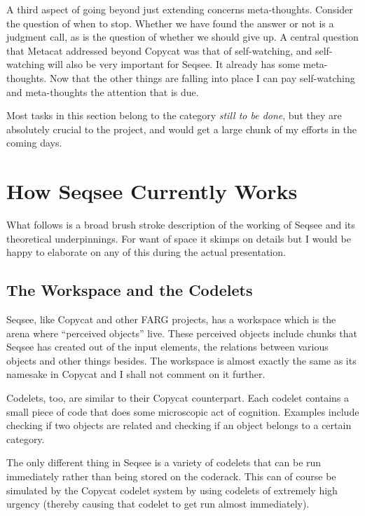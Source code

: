\documentclass[letterpaper]{article}
\begin{document}
A third aspect of going beyond just extending concerns meta-thoughts.  Consider the question of when to stop.  Whether we have found the answer or not is a judgment call, as is the question of whether we should give up. A central question that Metacat addressed beyond Copycat was that of self-watching, and self-watching will also be very important for Seqsee. It already has some meta-thoughts. Now that the other things are falling into place I can pay self-watching and meta-thoughts the attention that is due. 

Most tasks in this section belong to the category \emph{still to be done}, but they are absolutely crucial to the project, and would get a large chunk of my efforts in the coming days.



\section{How Seqsee Currently Works}
\label{sec:how}

What follows is a broad brush stroke description of the working of Seqsee and its theoretical underpinnings.  For want of space it skimps on details but I would be happy to elaborate on any of this during the actual presentation.

\subsection{The Workspace and the Codelets}

Seqsee, like Copycat and other FARG projects, has a workspace which is the arena where ``perceived objects'' live.  These perceived objects include chunks that Seqsee has created out of the input elements, the relations between various objects and other things besides.  The workspace is almost exactly the same as its namesake in Copycat and I shall not comment on it further.

Codelets, too, are similar to their Copycat counterpart. Each codelet contains a small piece of code that does some microscopic act of cognition.  Examples include checking if two objects are related and checking if an object belongs to a certain category.

The only different thing in Seqsee is a variety of codelets that can be run immediately rather than being stored on the coderack.  This can of course be simulated by the Copycat codelet system by using codelets of extremely high urgency (thereby causing that codelet to get run almost immediately).
\end{document}
